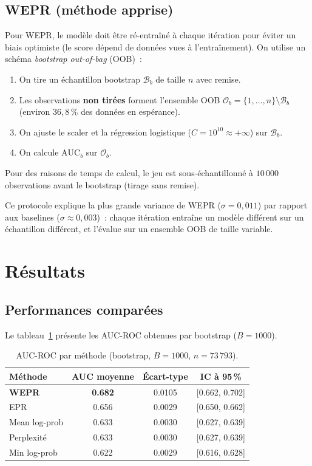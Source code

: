 \documentclass[11pt,a4paper]{article}
\begin{document}
\subsection{WEPR (méthode apprise)}

Pour WEPR, le modèle doit être ré-entraîné à chaque itération pour éviter un biais optimiste (le score dépend de données vues à l'entraînement). On utilise un schéma \emph{bootstrap out-of-bag} (OOB)~:
\begin{enumerate}
    \item On tire un échantillon bootstrap $\mathcal{B}_b$ de taille $n$ avec remise.
    \item Les observations \textbf{non tirées} forment l'ensemble OOB $\mathcal{O}_b = \{1, \dots, n\} \setminus \mathcal{B}_b$ (environ $36{,}8\,\%$ des données en espérance).
    \item On ajuste le scaler et la régression logistique ($C = 10^{10} \approx +\infty$) sur $\mathcal{B}_b$.
    \item On calcule $\text{AUC}_b$ sur $\mathcal{O}_b$.
\end{enumerate}
Pour des raisons de temps de calcul, le jeu est sous-échantillonné à $10\,000$ observations avant le bootstrap (tirage sans remise).

Ce protocole explique la plus grande variance de WEPR ($\sigma = 0{,}011$) par rapport aux baselines ($\sigma \approx 0{,}003$)~: chaque itération entraîne un modèle différent sur un échantillon différent, et l'évalue sur un ensemble OOB de taille variable.

\section{Résultats}

\subsection{Performances comparées}

Le tableau~\ref{tab:results} présente les AUC-ROC obtenues par bootstrap ($B = 1000$).

\begin{table}[h]
\centering
\caption{AUC-ROC par méthode (bootstrap, $B = 1000$, $n = 73\,793$).}
\label{tab:results}
\begin{tabular}{lccc}
\toprule
Méthode & AUC moyenne & Écart-type & IC à 95\,\% \\
\midrule
\textbf{WEPR}       & \textbf{0.682} & 0.0105 & [0.662, 0.702] \\
EPR                  & 0.656          & 0.0029 & [0.650, 0.662] \\
Mean log-prob        & 0.633          & 0.0030 & [0.627, 0.639] \\
Perplexité           & 0.633          & 0.0030 & [0.627, 0.639] \\
Min log-prob         & 0.622          & 0.0029 & [0.616, 0.628] \\
\bottomrule
\end{tabular}
\end{table}
\end{document}
